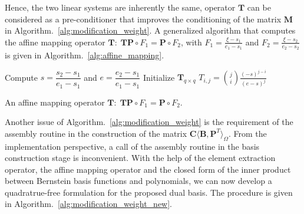 Hence, the two linear systems are inherently the same, operator $\mathbf{T}$ can be considered as a pre-conditioner that improves the conditioning of the matrix $\mathbf{M}$ in Algorithm.~\ref{alg:modification_weight}. A generalized algorithm that computes the affine mapping operator $\mathbf{T}\colon\; \mathbf{T}\mathbf{P}\circ F_1=\mathbf{P}\circ F_2$, with $F_1 = \frac{\xi-s_1}{e_1-s_1}$ and $F_2 = \frac{\xi-s_2}{e_2-s_2}$ is given in Algorithm.~\ref{alg:affine_mapping}.\par

\begin{algorithm}[H]\label{alg:affine_mapping}

	\BlankLine
	Compute $s = \dfrac{s_2-s_1}{e_1-s_1}$ and $e = \dfrac{e_2-s_1}{e_1-s_1}$\;
	Initialize $\mathbf{T}_{q\times q}$\;
	{
		{
			$T_{i,j}= \binom{j}{i}\frac{(-s)^{j-i}}{(e-s)^j}$
		}
	}
	\caption{An affine mapping operator $\mathbf{T}\colon\; \mathbf{T}\mathbf{P}\circ F_1=\mathbf{P}\circ F_2$.}
\end{algorithm}

Another issue of Algorithm.~\ref{alg:modification_weight} is the requirement of the assembly routine in the construction of the matrix $\mathbf{C}\langle{\mathbf{B},\mathbf{P}^T}\rangle_\Omega$. From the implementation perspective, a call of the assembly routine in the basis construction stage is inconvenient. With the help of the \Bezier element extraction operator, the affine mapping operator and the closed form of the inner product between Bernstein basis functions and polynomials, we can now develop a quadratrue-free formulation for the proposed dual basis. The procedure is given in Algorithm.~\ref{alg:modification_weight_new}.

